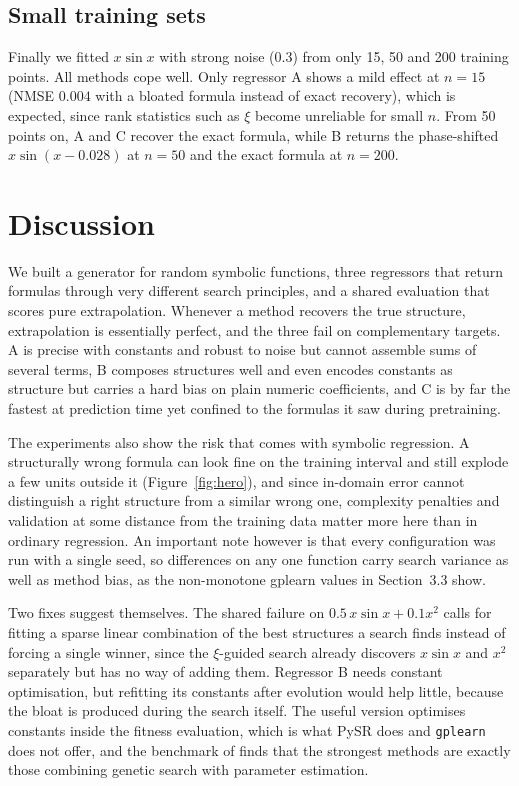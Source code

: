 \documentclass{article}
\begin{document}
\subsection{Small training sets}

Finally we fitted $x \sin x$ with strong noise ($0.3$) from only 15, 50
and 200 training points. All methods cope well. Only regressor A shows a
mild effect at $n=15$ (NMSE $0.004$ with a bloated formula instead of
exact recovery), which is expected, since rank statistics such as $\xi$
become unreliable for small $n$. From 50 points on, A and C recover the
exact formula, while B returns the phase-shifted $x \sin(x - 0.028)$ at
$n = 50$ and the exact formula at $n = 200$.

\section{Discussion}

We built a generator for random symbolic functions, three regressors
that return formulas through very different search principles, and a
shared evaluation that scores pure extrapolation. Whenever a method
recovers the true structure, extrapolation is essentially perfect, and
the three fail on complementary targets. A is precise with constants and
robust to noise but cannot assemble sums of several terms, B composes
structures well and even encodes constants as structure but carries a
hard bias on plain numeric coefficients, and C is by far the fastest at
prediction time yet confined to the formulas it saw during pretraining.

The experiments also show the risk that comes with symbolic regression.
A structurally wrong formula can look fine on the training interval and
still explode a few units outside it (Figure~\ref{fig:hero}), and since
in-domain error cannot distinguish a right structure from a similar
wrong one, complexity penalties and validation at some distance from the
training data matter more here than in ordinary regression. An important
note however is that every configuration was run with a single seed, so
differences on any one function carry search variance as well as method
bias, as the non-monotone gplearn values in Section~3.3 show.

Two fixes suggest themselves. The shared failure on
$0.5\,x\sin x + 0.1x^2$ calls for fitting a sparse linear combination of
the best structures a search finds instead of forcing a single winner,
since the $\xi$-guided search already discovers $x\sin x$ and $x^2$
separately but has no way of adding them. Regressor B needs constant
optimisation, but refitting its constants after evolution would help
little, because the bloat is produced during the search itself. The
useful version optimises constants inside the fitness evaluation, which
is what PySR does and \texttt{gplearn} does not offer, and the benchmark
of \citet{lacava2021contemporarysymbolicregressionmethods} finds that
the strongest methods are exactly those combining genetic search with
parameter estimation.



\end{document}
